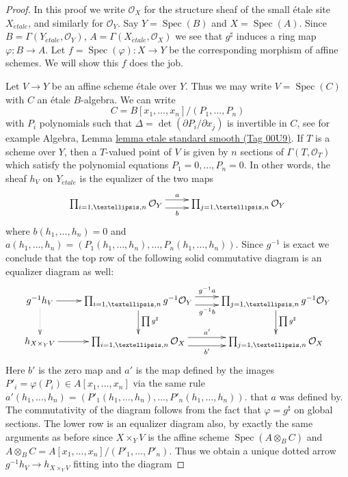 \documentclass{amsart}
\theoremstyle{plain}
\theoremstyle{definition}
\theoremstyle{remark}
\numberwithin{equation}{subsection}
\def\Spec{\mathop{\mathrm{Spec}}}
\def\etale{{\acute{e}tale}}
\begin{document}
\begin{proof}
In this proof we write $\mathcal{O}_X$ for the structure sheaf
of the small \'etale site $X_\etale$, and similarly for
$\mathcal{O}_Y$. Say $Y = \Spec(B)$ and $X = \Spec(A)$. Since
$B = \Gamma(Y_\etale, \mathcal{O}_Y)$,
$A = \Gamma(X_\etale, \mathcal{O}_X)$
we see that $g^\sharp$ induces a ring map $\varphi : B \to A$.
Let $f = \Spec(\varphi) : X \to Y$ be the corresponding morphism
of affine schemes. We will show this $f$ does the job.

\medskip\noindent
Let $V \to Y$ be an affine scheme \'etale over $Y$. Thus we may write
$V = \Spec(C)$ with $C$ an \'etale $B$-algebra. We can write
$$
C = B[x_1, \ldots, x_n]/(P_1, \ldots, P_n)
$$
with $P_i$ polynomials such that $\Delta = \det(\partial P_i/ \partial x_j)$
is invertible in $C$, see for example
Algebra, Lemma \href{https://stacks.math.columbia.edu/tag/00U9}{lemma etale standard smooth (Tag 00U9)}.
If $T$ is a scheme over $Y$, then a $T$-valued point of $V$ is given by
$n$ sections of $\Gamma(T, \mathcal{O}_T)$ which satisfy the polynomial
equations $P_1 = 0, \ldots, P_n = 0$. In other words, the sheaf $h_V$
on $Y_\etale$ is the equalizer of the two maps
$$
\xymatrix{
\prod\nolimits_{i = 1, \ldots, n} \mathcal{O}_Y
\ar@<1ex>[r]^a \ar@<-1ex>[r]_b &
\prod\nolimits_{j = 1, \ldots, n} \mathcal{O}_Y
}
$$
where $b(h_1, \ldots, h_n) = 0$ and
$a(h_1, \ldots, h_n) =
(P_1(h_1, \ldots, h_n), \ldots, P_n(h_1, \ldots, h_n))$.
Since $g^{-1}$ is exact we conclude that the top row of the
following solid commutative diagram is an equalizer diagram as well:
$$
\xymatrix{
g^{-1}h_V \ar[r] \ar@{..>}[d] &
\prod\nolimits_{i = 1, \ldots, n} g^{-1}\mathcal{O}_Y
\ar@<1ex>[r]^{g^{-1}a} \ar@<-1ex>[r]_{g^{-1}b} \ar[d]^{\prod g^\sharp} &
\prod\nolimits_{j = 1, \ldots, n} g^{-1}\mathcal{O}_Y \ar[d]^{\prod g^\sharp}\\
h_{X \times_Y V} \ar[r] &
\prod\nolimits_{i = 1, \ldots, n} \mathcal{O}_X
\ar@<1ex>[r]^{a'} \ar@<-1ex>[r]_{b'} &
\prod\nolimits_{j = 1, \ldots, n} \mathcal{O}_X  \\
}
$$
Here $b'$ is the zero map and $a'$ is the map defined by the
images $P'_i = \varphi(P_i) \in A[x_1, \ldots, x_n]$ via the same
rule
$a'(h_1, \ldots, h_n) =
(P'_1(h_1, \ldots, h_n), \ldots, P'_n(h_1, \ldots, h_n))$.
that $a$ was defined by. The commutativity of the diagram follows from
the fact that $\varphi = g^\sharp$ on global sections. The lower
row is an equalizer diagram also, by exactly the same arguments as
before since $X \times_Y V$ is the affine scheme
$\Spec(A \otimes_B C)$ and
$A \otimes_B C = A[x_1, \ldots, x_n]/(P'_1, \ldots, P'_n)$.
Thus we obtain a unique dotted arrow
$g^{-1}h_V \to h_{X \times_Y V}$ fitting into the diagram


\end{proof}
\end{document}
